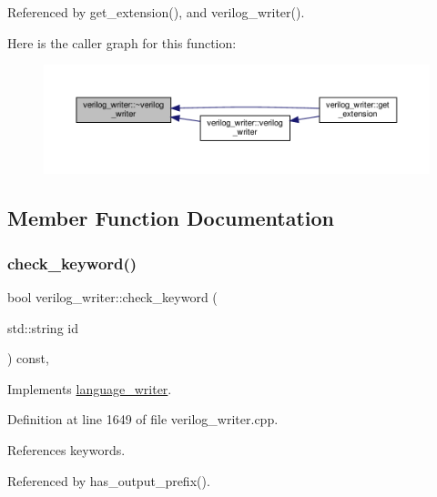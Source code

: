 Referenced by get\+\_\+extension(), and verilog\+\_\+writer().

Here is the caller graph for this function\+:
\nopagebreak
\begin{figure}[H]
\begin{center}
\leavevmode
\includegraphics[width=350pt]{d8/dba/classverilog__writer_ac301c11a82d8f9e788332550df4271f7_icgraph}
\end{center}
\end{figure}


\subsection{Member Function Documentation}
\mbox{\label{classverilog__writer_a1595f62191efb28fa23d944791bbdd71}} 
\subsubsection{\texorpdfstring{check\+\_\+keyword()}{check\_keyword()}}
{\footnotesize\ttfamily bool verilog\+\_\+writer\+::check\+\_\+keyword (\begin{DoxyParamCaption}\item[{std\+::string}]{id }\end{DoxyParamCaption}) const\hspace{0.3cm}{\ttfamily [override]}, {\ttfamily [virtual]}}



Implements \hyperlink{classlanguage__writer_a5a69f96be3c6c3cab69325058c077d21}{language\+\_\+writer}.



Definition at line 1649 of file verilog\+\_\+writer.\+cpp.



References keywords.



Referenced by has\+\_\+output\+\_\+prefix().

